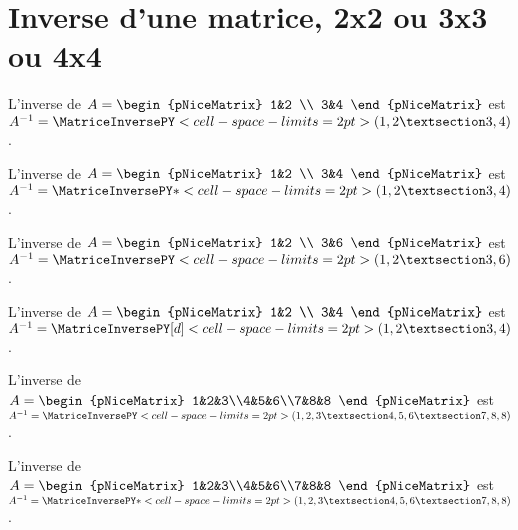 \documentclass[french,a4paper,10pt]{article}
\begin{document}
\section{Inverse d'une matrice, 2x2 ou 3x3 ou 4x4}

\begin{ShowCodeTeX}
L'inverse de $A=\begin{pNiceMatrix} 1&2 \\ 3&4 \end{pNiceMatrix}$ est
$A^{-1}=\MatriceInversePY<cell-space-limits=2pt>(1,2 § 3,4)$.
\end{ShowCodeTeX}

\begin{ShowCodeTeX}
L'inverse de $A=\begin{pNiceMatrix} 1&2 \\ 3&4 \end{pNiceMatrix}$ est
$A^{-1}=\MatriceInversePY*<cell-space-limits=2pt>(1,2 § 3,4)$.
\end{ShowCodeTeX}

\begin{ShowCodeTeX}
L'inverse de $A=\begin{pNiceMatrix} 1&2 \\ 3&6 \end{pNiceMatrix}$ est
$A^{-1}=\MatriceInversePY<cell-space-limits=2pt>(1,2 § 3,6)$.
\end{ShowCodeTeX}

\begin{ShowCodeTeX}
L'inverse de $A=\begin{pNiceMatrix} 1&2 \\ 3&4 \end{pNiceMatrix}$ est
$A^{-1}=\MatriceInversePY[d]<cell-space-limits=2pt>(1,2 § 3,4)$.
\end{ShowCodeTeX}

\begin{ShowCodeTeX}
L'inverse de $A=\begin{pNiceMatrix} 1&2&3\\4&5&6\\7&8&8 \end{pNiceMatrix}$ est
$A^{-1}=\MatriceInversePY<cell-space-limits=2pt>(1,2,3 § 4,5,6 § 7,8,8)$.
\end{ShowCodeTeX}

\begin{ShowCodeTeX}
L'inverse de $A=\begin{pNiceMatrix} 1&2&3\\4&5&6\\7&8&8 \end{pNiceMatrix}$ est
$A^{-1}=\MatriceInversePY*<cell-space-limits=2pt>(1,2,3 § 4,5,6 § 7,8,8)$.
\end{ShowCodeTeX}
\end{document}
